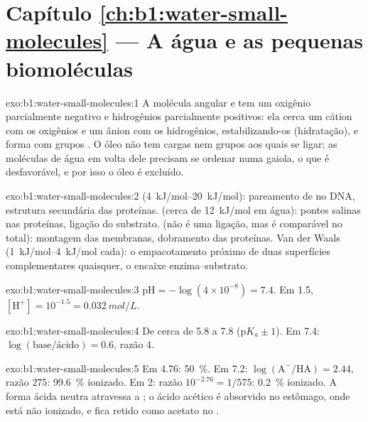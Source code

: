\section*{Capítulo \ref{ch:b1:water-small-molecules} --- A água e as pequenas biomoléculas}

\begin{solution}{exo:b1:water-small-molecules:1}
A molécula angular e  tem um oxigênio parcialmente negativo e
hidrogênios parcialmente positivos: ela cerca um cátion com os oxigênios
e um ânion com os hidrogênios, estabilizando-os (hidratação), e forma
 com grupos . O óleo não tem cargas nem
grupos  aos quais se ligar; as moléculas de água em volta dele
precisam se ordenar numa gaiola, o que é desfavorável, e por isso o óleo
é excluído.
\end{solution}

\begin{solution}{exo:b1:water-small-molecules:2}
 (\qtyrange{4}{20}{kJ/mol}): pareamento de  no
DNA, estrutura secundária das proteínas.  (cerca de
\qty{12}{kJ/mol} em água): pontes salinas nas proteínas, ligação do
substrato.  (não é uma ligação, mas é comparável no
total): montagem das membranas, dobramento das proteínas. Van der Waals
(\qtyrange{1}{4}{kJ/mol} cada): o empacotamento próximo de duas
superfícies complementares quaisquer, o encaixe enzima--substrato.
\end{solution}

\begin{solution}{exo:b1:water-small-molecules:3}
$\mathrm{pH} = -\log(4\times 10^{-8}) = 7.4$. Em  1.5,
$[\mathrm{H^+}] = 10^{-1.5} = \qty{0.032}{mol/L}$.
\end{solution}

\begin{solution}{exo:b1:water-small-molecules:4}
De cerca de 5.8 a 7.8 (p$K_a \pm 1$). Em 7.4: $\log(\text{base}/\text{ácido})
= 0.6$, razão $4$.
\end{solution}

\begin{solution}{exo:b1:water-small-molecules:5}
Em  4.76: \qty{50}{\%}. Em 7.2: $\log(\mathrm{A^-}/\mathrm{HA}) =
2.44$, razão $275$: \qty{99.6}{\%} ionizado. Em  2: razão $10^{-2.76} =
1/575$: \qty{0.2}{\%} ionizado. A forma ácida neutra atravessa a
; o ácido acético é absorvido no estômago, onde está
não ionizado, e fica retido como acetato no .
\end{solution}

